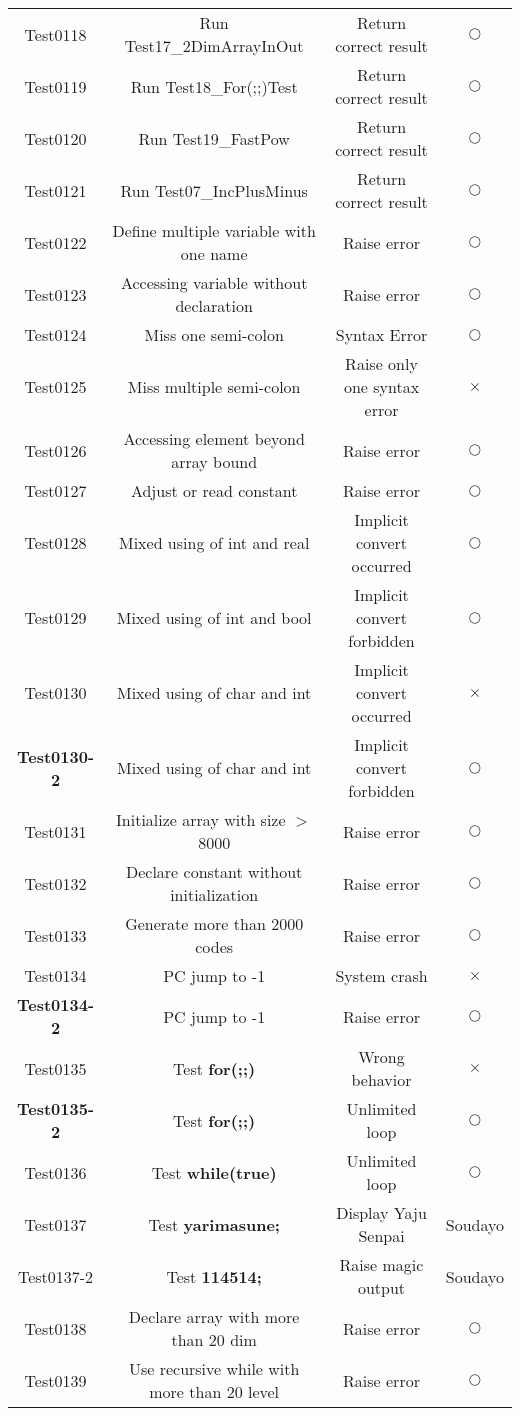 \documentclass{article}
\begin{document}
\begin{center}
\begin{tabular}{cccc}
			Test0118 & Run Test17\_2DimArrayInOut & Return correct result & $ \bigcirc $ \\
			Test0119 & Run Test18\_For(;;)Test & Return correct result & $ \bigcirc $ \\
			Test0120 & Run Test19\_FastPow & Return correct result & $ \bigcirc $ \\
			Test0121 &  Run Test07\_IncPlusMinus & Return correct result & $ \bigcirc $ \\
			Test0122 & Define multiple variable with one name & Raise error & $ \bigcirc $\\
			Test0123 & Accessing variable without declaration & Raise error & $ \bigcirc $\\
			Test0124 & Miss one semi-colon & Syntax Error &  $ \bigcirc $\\
			Test0125 & Miss multiple semi-colon & Raise only one syntax error & $ \times $\\
			Test0126 & Accessing element beyond array bound & Raise error & $ \bigcirc $ \\
			Test0127 & Adjust or read constant & Raise error & $ 
		\bigcirc $\\
			Test0128 & Mixed using of int and real & Implicit convert occurred & $ \bigcirc $\\
			Test0129 & Mixed using of int and bool & Implicit convert forbidden & $ \bigcirc $\\
			Test0130 & Mixed using of char and int & Implicit convert occurred & $ \times $\\
			\textbf{Test0130-2} & Mixed using of char and int & Implicit convert forbidden & $ \bigcirc $\\
			Test0131 & Initialize array with size $ > $8000 & Raise error & $ \bigcirc $\\
			Test0132 & Declare constant without initialization & Raise error & $ \bigcirc $\\
			Test0133 & Generate more than 2000 codes & Raise error & $ \bigcirc $\\
			Test0134 & PC jump to -1 & System crash & $ \times $\\
			\textbf{Test0134-2} & PC jump to -1 & Raise error & $ \bigcirc $\\
			Test0135 & Test \textbf{for(;;)} & Wrong behavior & $ \times $\\
			\textbf{Test0135-2} & Test \textbf{for(;;)} & Unlimited loop & $ \bigcirc $\\
			Test0136 & Test \textbf{while(true)} & Unlimited loop & $ \bigcirc $\\
			Test0137 & Test \textbf{yarimasune;} & Display Yaju Senpai & Soudayo\\
			Test0137-2 & Test \textbf{114514;} & Raise magic output & Soudayo \\
			Test0138 & Declare array with more than 20 dim & Raise error & $ \bigcirc $\\
			Test0139 & Use recursive while with more than 20 level & Raise error & $ \bigcirc $\\
			\bottomrule
			\end{tabular}
			\end{center}
\end{document}
